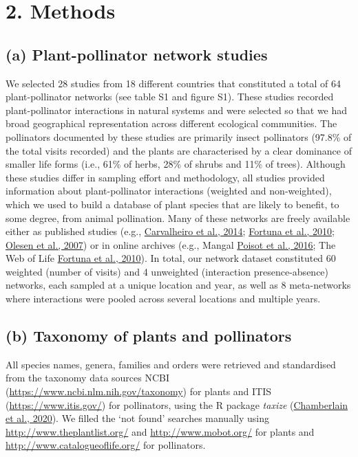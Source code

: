 \documentclass[
  12pt,
  a4paper,
]{article}
\begin{document}
\hypertarget{methods}{%
\section{2. Methods}\label{methods}}

\hypertarget{a-plant-pollinator-network-studies}{%
\subsection{(a) Plant-pollinator network studies}\label{a-plant-pollinator-network-studies}}

We selected 28 studies from 18 different countries that constituted a total of 64 plant-pollinator networks (see table S1 and figure S1). These studies recorded plant-pollinator interactions in natural systems and were selected so that we had broad geographical representation across different ecological communities. The pollinators documented by these studies are primarily insect pollinators (97.8\% of the total visits recorded) and the plants are characterised by a clear dominance of smaller life forms (i.e., 61\% of herbs, 28\% of shrubs and 11\% of trees). Although these studies differ in sampling effort and methodology, all studies provided information about plant-pollinator interactions (weighted and non-weighted), which we used to build a database of plant species that are likely to benefit, to some degree, from animal pollination. Many of these networks are freely available either as published studies (e.g., \protect\hyperlink{ref-carvalheiro2014}{Carvalheiro et al., 2014}; \protect\hyperlink{ref-fortuna2010}{Fortuna et al., 2010}; \protect\hyperlink{ref-olesen2007}{Olesen et al., 2007}) or in online archives (e.g., Mangal \protect\hyperlink{ref-poisot2016}{Poisot et al., 2016}; The Web of Life \protect\hyperlink{ref-fortuna2010}{Fortuna et al., 2010}). In total, our network dataset constituted 60 weighted (number of visits) and 4 unweighted (interaction presence-absence) networks, each sampled at a unique location and year, as well as 8 meta-networks where interactions were pooled across several locations and multiple years.

\hypertarget{b-taxonomy-of-plants-and-pollinators}{%
\subsection{(b) Taxonomy of plants and pollinators}\label{b-taxonomy-of-plants-and-pollinators}}

All species names, genera, families and orders were retrieved and standardised from the taxonomy data sources NCBI (\url{https://www.ncbi.nlm.nih.gov/taxonomy}) for plants and ITIS (\url{https://www.itis.gov/}) for pollinators, using the R package \emph{taxize} (\protect\hyperlink{ref-chamberlain2020}{Chamberlain et al., 2020}). We filled the `not found' searches manually using \url{http://www.theplantlist.org/} and \url{http://www.mobot.org/} for plants and \url{http://www.catalogueoflife.org/} for pollinators.
\end{document}
